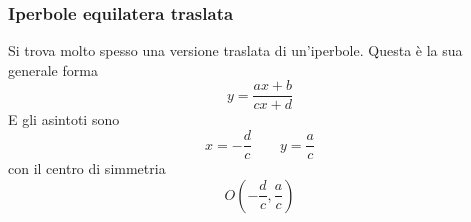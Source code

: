 \subsubsection{Iperbole equilatera traslata}
Si trova molto spesso una versione traslata di un'iperbole. Questa è la sua generale forma
\begin{equation*}
  y=\frac{ax+b}{cx+d}
\end{equation*}
E gli asintoti sono
\begin{equation*}
  x=-\frac{d}{c}\qquad y=\frac{a}{c}
\end{equation*}
con il centro di simmetria
\begin{equation*}
  O\left(-\frac{d}{c},\frac{a}{c}\right)
\end{equation*}
